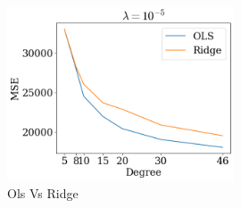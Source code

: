\documentclass[twoside,11pt]{report}
\begin{document}
\begin{figure}[!h]
    \begin{center}
        \includegraphics[width=0.6\textwidth]{../runsAndAdditions/OLSvsRidgeReal.png}
    \end{center}
    \caption{Ols Vs Ridge}\label{fig:OLSvsRidgeReal}
\end{figure}
\end{document}
